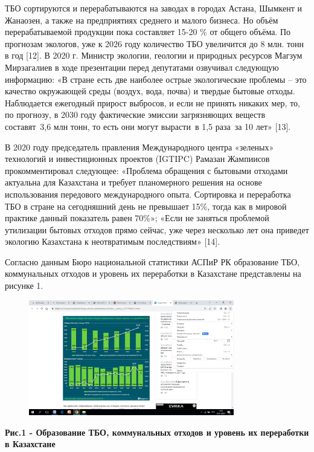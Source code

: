 ТБО сортируются и перерабатываются на заводах в городах Астана, Шымкент
и Жанаозен, а также на предприятиях среднего и малого бизнеса. Но объём
перерабатываемой продукции пока составляет 15-20 \% от общего объёма. По
прогнозам экологов, уже к 2026 году количество ТБО увеличится до 8 млн.
тонн в год {[}12{]}. В 2020 г. Министр экологии, геологии и природных
ресурсов Магзум Мирзагалиев в ходе презентации перед депутатами
озвучивал следующую информацию: «В стране есть две наиболее острые
экологические проблемы -- это качество окружающей среды (воздух, вода,
почва) и твердые бытовые отходы. Наблюдается ежегодный прирост выбросов,
и если не принять никаких мер, то, по прогнозу, в 2030 году фактические
эмиссии загрязняющих веществ составят~3,6 млн тонн, то есть они могут
вырасти~в 1,5 раза~за 10 лет» {[}13{]}.

В 2020 году председатель правления Международного центра «зеленых»
технологий и инвестиционных проектов (IGTIPC) Рамазан Жампиисов
прокомментировал следующее: «Проблема обращения с бытовыми отходами
актуальна для Казахстана и требует планомерного решения на основе
использования передового международного опыта. Сортировка и переработка
ТБО в стране на сегодняшний день не превышает 15\%, тогда как в мировой
практике данный показатель равен 70\%»; «Если не заняться проблемой
утилизации бытовых отходов прямо сейчас, уже через несколько лет она
приведет экологию Казахстана к неотвратимым последствиям» {[}14{]}.~

Согласно данным Бюро национальной статистики АСПиР РК образование ТБО,
коммунальных отходов и уровень их переработки в Казахстане представлены
на рисунке 1.


\begin{figure}[H]
	\centering
	\includegraphics[width=0.8\textwidth]{media/chem2/image66}
	\caption*{}
\end{figure}


{\bfseries Рис.1 - Образование ТБО, коммунальных отходов и уровень их
переработки в Казахстане}

